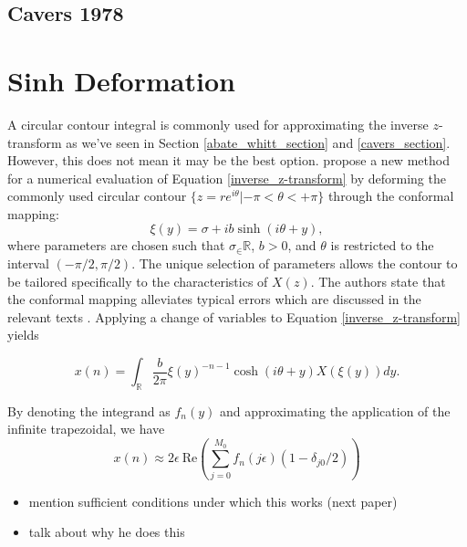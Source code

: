 \documentclass[a4paper]{report}
\begin{document}
\subsection{Cavers 1978}

\section{Sinh Deformation}
A circular contour integral is commonly used for approximating the inverse $z$-transform as we've seen in Section \ref{abate_whitt_section} and \ref{cavers_section}. However, this does not mean it may be the best option. \citet{levendorskii2022sinh} propose a new method for a numerical evaluation of Equation \ref{inverse_z-transform} by deforming the commonly used circular contour $\{z = re^{i\theta} | -\pi < \theta < +\pi\}$ through the conformal mapping:
\begin{equation}\label{equation:conformal_mapping}
    \xi(y) = \sigma + ib\sinh(i\theta + y),
\end{equation}
where parameters are chosen such that $\sigma_\in \mathbb{R}$, $b > 0$, and $\theta$ is restricted to the interval $(-\pi/2, \pi / 2)$. The unique selection of parameters allows the contour to be tailored specifically to the characteristics of $X(z)$. The authors state that the conformal mapping alleviates typical errors which are discussed in the relevant texts \citep{boyarchenko2014efficient, boyarchenko2019sinh, schmelzer2007computing}. Applying a change of variables to Equation \ref{inverse_z-transform} yields

\begin{equation}
    x(n) = \int_\mathbb{R} \frac{b}{2\pi} \xi(y)^{-n-1} \cosh(i\theta + y) X(\xi(y)) dy.
\end{equation}

By denoting the integrand as $f_n(y)$ and approximating the application of the infinite trapezoidal, we have 
\begin{equation}
    x(n) \approx 2 \epsilon\ \text{Re}\left( \sum_{j = 0}^{M_0} f_n(j \epsilon)(1 - \delta_{j0}/2) \right)
\end{equation}


\begin{itemize}
    \item mention sufficient conditions under which this works (next paper)
    \item talk about why he does this
\end{itemize}
\end{document}
